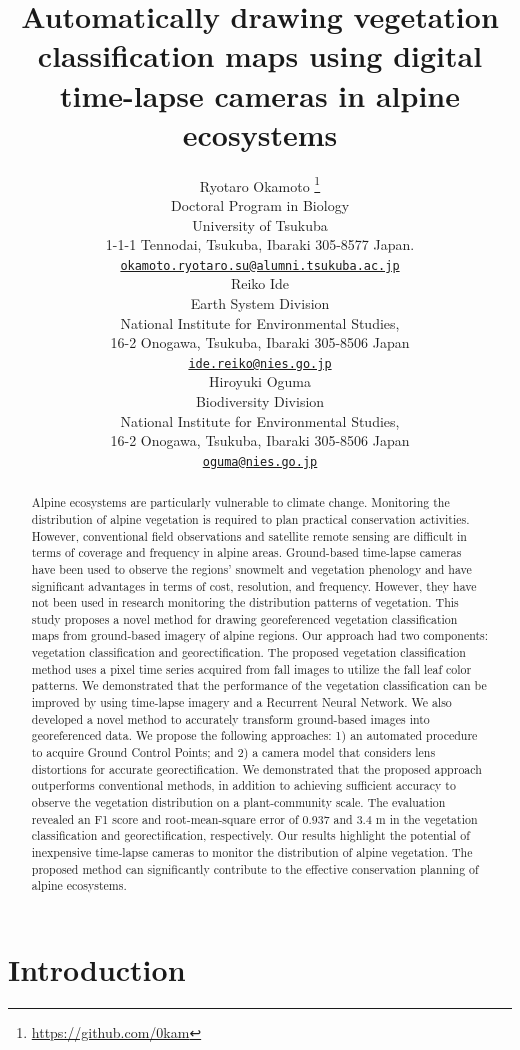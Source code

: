 \documentclass{article}
\title{Automatically drawing vegetation classification maps using digital time-lapse cameras in alpine ecosystems}
\author{
    Ryotaro Okamoto
    \thanks{\url{https://github.com/0kam}}
   \\
    Doctoral Program in Biology \\
    University of Tsukuba \\
  1-1-1 Tennodai, Tsukuba, Ibaraki 305-8577 Japan. \\
  \texttt{\href{mailto:okamoto.ryotaro.su@alumni.tsukuba.ac.jp}{\nolinkurl{okamoto.ryotaro.su@alumni.tsukuba.ac.jp}}} \\
   \And
    Reiko Ide
   \\
    Earth System Division \\
    National Institute for Environmental Studies, \\
  16-2 Onogawa, Tsukuba, Ibaraki 305-8506 Japan \\
  \texttt{\href{mailto:ide.reiko@nies.go.jp}{\nolinkurl{ide.reiko@nies.go.jp}}} \\
   \And
    Hiroyuki Oguma
   \\
    Biodiversity Division \\
    National Institute for Environmental Studies, \\
  16-2 Onogawa, Tsukuba, Ibaraki 305-8506 Japan \\
  \texttt{\href{mailto:oguma@nies.go.jp}{\nolinkurl{oguma@nies.go.jp}}} \\  
  }
\begin{document}
\maketitle

\begin{abstract}
Alpine ecosystems are particularly vulnerable to climate change. Monitoring the distribution of alpine vegetation is required to plan practical conservation activities. However, conventional field observations and satellite remote sensing are difficult in terms of coverage and frequency in alpine areas. Ground-based time-lapse cameras have been used to observe the regions' snowmelt and vegetation phenology and have significant advantages in terms of cost, resolution, and frequency. However, they have not been used in research monitoring the distribution patterns of vegetation. This study proposes a novel method for drawing georeferenced vegetation classification maps from ground-based imagery of alpine regions. Our approach had two components: vegetation classification and georectification. The proposed vegetation classification method uses a pixel time series acquired from fall images to utilize the fall leaf color patterns. We demonstrated that the performance of the vegetation classification can be improved by using time-lapse imagery and a Recurrent Neural Network. We also developed a novel method to accurately transform ground-based images into georeferenced data. We propose the following approaches: 1) an automated procedure to acquire Ground Control Points; and 2) a camera model that considers lens distortions for accurate georectification. We demonstrated that the proposed approach outperforms conventional methods, in addition to achieving sufficient accuracy to observe the vegetation distribution on a plant-community scale. The evaluation revealed an F1 score and root-mean-square error of 0.937 and 3.4 m in the vegetation classification and georectification, respectively. Our results highlight the potential of inexpensive time-lapse cameras to monitor the distribution of alpine vegetation. The proposed method can significantly contribute to the effective conservation planning of alpine ecosystems.
\end{abstract}


\hypertarget{introduction}{%
\section{Introduction}\label{introduction}}
\end{document}
